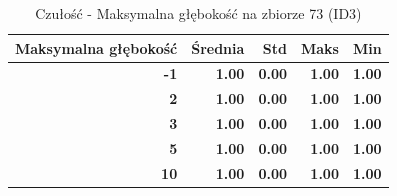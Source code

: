\begin{table}[htbp]
\centering
\small
\setlength{\tabcolsep}{6pt}
\renewcommand{\arraystretch}{1.2}
\caption{Czułość - Maksymalna głębokość na zbiorze 73 (ID3)}
\label{tab:ID3_max_depth_73_recall}
\begin{tabular}{r|r|r|r|r}
\toprule
Maksymalna głębokość & Średnia & Std & Maks & Min \\
\hline
\textbf{-1} & \textbf{1.00} & \textbf{0.00} & \textbf{1.00} & \textbf{1.00} \\
\textbf{2} & \textbf{1.00} & \textbf{0.00} & \textbf{1.00} & \textbf{1.00} \\
\textbf{3} & \textbf{1.00} & \textbf{0.00} & \textbf{1.00} & \textbf{1.00} \\
\textbf{5} & \textbf{1.00} & \textbf{0.00} & \textbf{1.00} & \textbf{1.00} \\
\textbf{10} & \textbf{1.00} & \textbf{0.00} & \textbf{1.00} & \textbf{1.00} \\
\bottomrule
\end{tabular}
\end{table}